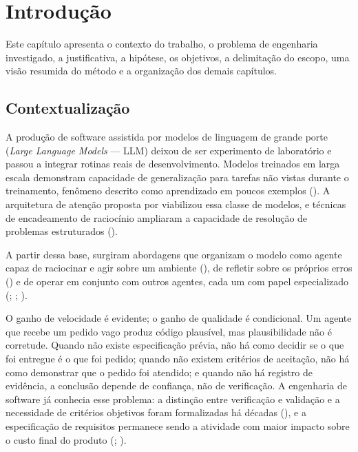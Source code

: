 
\chapter{Introdução}
\label{cap:introducao}

Este capítulo apresenta o contexto do trabalho, o problema de engenharia
investigado, a justificativa, a hipótese, os objetivos, a delimitação do escopo,
uma visão resumida do método e a organização dos demais capítulos.

\section{Contextualização}
\label{sec:contextualizacao}

A produção de software assistida por modelos de linguagem de grande porte
(\textit{Large Language Models} --- LLM) deixou de ser experimento de laboratório
e passou a integrar rotinas reais de desenvolvimento. Modelos treinados em larga
escala demonstram capacidade de generalização para tarefas não vistas durante o
treinamento, fenômeno descrito como aprendizado em poucos exemplos
(). A arquitetura de atenção
proposta por  viabilizou essa classe de modelos, e
técnicas de encadeamento de raciocínio ampliaram a capacidade de resolução de
problemas estruturados ().

A partir dessa base, surgiram abordagens que organizam o modelo como agente
capaz de raciocinar e agir sobre um ambiente (), de
refletir sobre os próprios erros () e de operar em
conjunto com outros agentes, cada um com papel especializado
(; ;
).

O ganho de velocidade é evidente; o ganho de qualidade é condicional. Um agente
que recebe um pedido vago produz código plausível, mas plausibilidade não é
corretude. Quando não existe especificação prévia, não há como decidir se o que
foi entregue é o que foi pedido; quando não existem critérios de aceitação, não
há como demonstrar que o pedido foi atendido; e quando não há registro de
evidência, a conclusão depende de confiança, não de verificação. A engenharia de
software já conhecia esse problema: a distinção entre verificação e validação e a
necessidade de critérios objetivos foram formalizadas há décadas
(), e a especificação de requisitos permanece sendo a
atividade com maior impacto sobre o custo final do produto
(; ).

